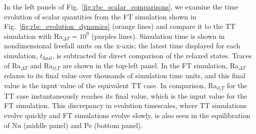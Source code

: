 \documentclass[aps, pre, onecolumn, nofootinbib, notitlepage, groupedaddress, amsfonts, amssymb, amsmath, longbibliography, superscriptaddress]{revtex4-1}
\begin{document}
In the left panels of Fig.~\ref{fig:rbc_scalar_comparisons}, we examine the time evolution of scalar quantities from the FT simulation shown in Fig.~\ref{fig:rbc_evolution_dynamics} (orange lines) and compare it to the TT simulation with Ra$_{\Delta T} = 10^9$ (purples lines).
Simulation time is shown in nondimensional freefall units on the x-axis; the latest time displayed for each simulation, $t_{\text{final}}$, is subtracted for direct comparison of the relaxed states.
Traces of Ra$_{\Delta T}$ and Ra$_{\partial_z T}$ are shown in the top-left panel.
In the FT simulation, Ra$_{\Delta T}$ relaxes to its final value over thousands of simulation time units, and this final value is the input value of the equivalent TT case.
In comparison, Ra$_{\partial_z T}$ for the TT case instantaneously reaches its final value, which is the input value for the FT simulation.
This discrepancy in evolution timescales, where TT simulations evolve quickly and FT simulations evolve slowly, is also seen in the equilibration of Nu (middle panel) and Pe (bottom panel).
\end{document}
